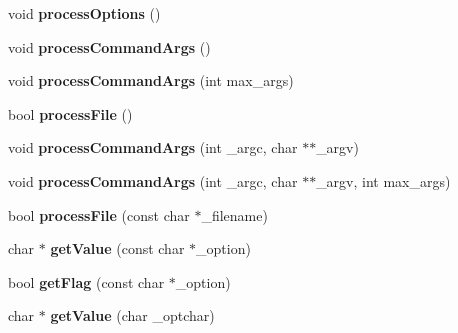 \begin{DoxyCompactItemize}
\item 
\hypertarget{class_any_option_a0b123acf86297aa6265229bdd13a827a}{void {\bfseries process\-Options} ()}\label{class_any_option_a0b123acf86297aa6265229bdd13a827a}

\item 
\hypertarget{class_any_option_a1f21716ac11330a364fe1d8a17efa7dc}{void {\bfseries process\-Command\-Args} ()}\label{class_any_option_a1f21716ac11330a364fe1d8a17efa7dc}

\item 
\hypertarget{class_any_option_acbb92b2ed06429530419797e27a66835}{void {\bfseries process\-Command\-Args} (int max\-\_\-args)}\label{class_any_option_acbb92b2ed06429530419797e27a66835}

\item 
\hypertarget{class_any_option_ac1de1647788ce0f5bed576d90e518124}{bool {\bfseries process\-File} ()}\label{class_any_option_ac1de1647788ce0f5bed576d90e518124}

\item 
\hypertarget{class_any_option_a6eb4b1407b58fff76dd94d41f3c5af72}{void {\bfseries process\-Command\-Args} (int \-\_\-argc, char $\ast$$\ast$\-\_\-argv)}\label{class_any_option_a6eb4b1407b58fff76dd94d41f3c5af72}

\item 
\hypertarget{class_any_option_a3722651e433d69c380f88f76075d7809}{void {\bfseries process\-Command\-Args} (int \-\_\-argc, char $\ast$$\ast$\-\_\-argv, int max\-\_\-args)}\label{class_any_option_a3722651e433d69c380f88f76075d7809}

\item 
\hypertarget{class_any_option_a9f28e85054331866e0f32bf5a8088607}{bool {\bfseries process\-File} (const char $\ast$\-\_\-filename)}\label{class_any_option_a9f28e85054331866e0f32bf5a8088607}

\item 
\hypertarget{class_any_option_aebf849538e3a6e8b05075231bf22a609}{char $\ast$ {\bfseries get\-Value} (const char $\ast$\-\_\-option)}\label{class_any_option_aebf849538e3a6e8b05075231bf22a609}

\item 
\hypertarget{class_any_option_a4ea37ce527b713f9a6d15d3a3ea837ef}{bool {\bfseries get\-Flag} (const char $\ast$\-\_\-option)}\label{class_any_option_a4ea37ce527b713f9a6d15d3a3ea837ef}

\item 
\hypertarget{class_any_option_ad31c09eeb4b654bd029284d910a2dab4}{char $\ast$ {\bfseries get\-Value} (char \-\_\-optchar)}\label{class_any_option_ad31c09eeb4b654bd029284d910a2dab4}


\end{DoxyCompactItemize}
